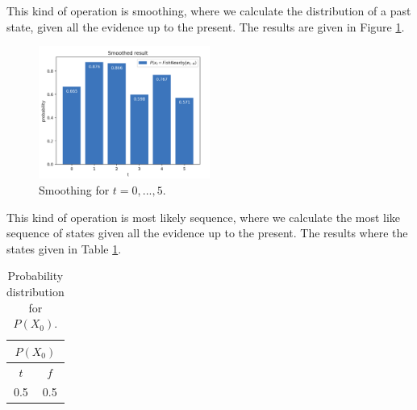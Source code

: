 \documentclass[11pt, a4paper, english]{NTNUoving}
\begin{document}
\begin{oppgave}
\begin{punkt}
    This kind of operation is smoothing, where we calculate the distribution of a past state, given all the evidence up to the present.
    The results are given in Figure \ref{fig:smoothing}.

    \begin{figure}[H]
        \centering
        \includegraphics[width=0.5\textwidth]{smoothing.png}
        \caption{Smoothing for $t = 0,...,5$.}
        \label{fig:smoothing}
    \end{figure}
\end{punkt}

\begin{punkt}
    This kind of operation is most likely sequence, where we calculate the most like sequence of states given all the evidence up to the present.
    The results where the states given in Table \ref{tab:4}.

    \begin{table}[H]
        \centering
        \begin{tabular}{|c|c|}
            \hline
           \multicolumn{2}{|c|}{$P(X_0)$} \\ [0.5ex]
            \hline
            $t$ & $f$ \\
            \hline
            0.5 & 0.5 \\ [1.0ex]
            \hline
    \end{tabular}
        \caption{Probability distribution for $P(X_0)$.}
        \label{tab:4}
    \end{table}
\end{punkt}

\end{oppgave}

\begin{oppgave}
    \begin{punkt}

    \end{punkt}

    \begin{punkt}
        \label{2b}
    \end{punkt}
\end{oppgave}
\end{document}
